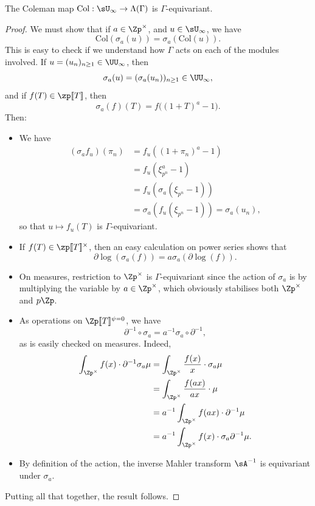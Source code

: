 \documentclass[a4paper,10pt, english, reqno]{smfart}
\newcommand{\lsem}{[\! [}
\newcommand{\rsem}{]\! ]}
\newcommand{\GG}{\Gamma}
\numberwithin{equation}{section}
\begin{document}
\begin{proposition}
	The Coleman map $\mathrm{Col} : \sU_{\infty} \to \Lambda(\GG)$ is $\GG$-equivariant. 
\end{proposition}
\begin{proof}
	We must show that if $a \in \Zp^\times$, and $u \in \sU_{\infty}$, we have
	\[
	\mathrm{Col}(\sigma_a(u)) = \sigma_a(\mathrm{Col}(u)).
	\]
	This is easy to check if we understand how $\GG$ acts on each of the modules involved. If $u = (u_n)_{n \geq 1} \in \UU_\infty$, then 
	\[
	\sigma_a(u) = (\sigma_a(u_n))_{n \geq 1} \in \UU_\infty,
	\]
	and if $f(T) \in \zp\lsem T\rsem $, then 
	\[\sigma_a(f)(T) = f\big((1 + T)^a - 1\big).\]
	Then:
	\begin{itemize}
		\item We have
		\begin{align*}
			(\sigma_a f_u)(\pi_n) &= f_u((1 + \pi_n)^a - 1) \\
			&= f_u(\xi_{p^n}^a - 1) \\
			& = f_u(\sigma_a(\xi_{p^n} - 1)) \\
			&= \sigma_a(f_u(\xi_{p^n}-1)) = \sigma_a(u_n),
		\end{align*}
		so that $u \mapsto f_u(T)$ is $\GG$-equivariant.
		\item If $f(T) \in \zp\lsem T\rsem ^\times$, then an easy calculation on power series shows that
		\begin{equation}\label{eq:dlog equivariant}
		\partial\log(\sigma_a(f)) = a \sigma_a(\partial\log(f)).
		\end{equation}
		\item On measures, restriction to $\Zp^\times$ is $\GG$-equivariant since the action of $\sigma_a$ is by multiplying the variable by $a \in \Zp^\times$, which obviously stabilises both $\Zp^\times$ and $p\Zp$.
		\item 	As operations on $\Zp\lsem T\rsem ^{\psi = 0}$, we have 
		\begin{equation}\label{eq:delta equivariant}
		\partial^{-1} \circ \sigma_a = a^{-1} \sigma_a \circ \partial^{-1},
		\end{equation}
		as is easily checked on measures. Indeed, 
		\begin{align*}
			\int_{\Zp^\times} f(x) \cdot \partial^{-1}\sigma_a \mu &= \int_{\Zp^\times}\frac{f(x)}{x} \cdot \sigma_a \mu\\
			&= \int_{\Zp^\times}\frac{f(ax)}{ax} \cdot \mu \\
			&= a^{-1} \int_{\Zp^\times}f(ax) \cdot \partial^{-1}\mu\\
			&= a^{-1} \int_{\Zp^\times} f(x) \cdot \sigma_a\partial^{-1} \mu.
		\end{align*}
		\item By definition of the action, the inverse Mahler transform $\sA^{-1}$ is equivariant under $\sigma_a$.
	\end{itemize}
	Putting all that together, the result follows.
\end{proof}
\end{document}
